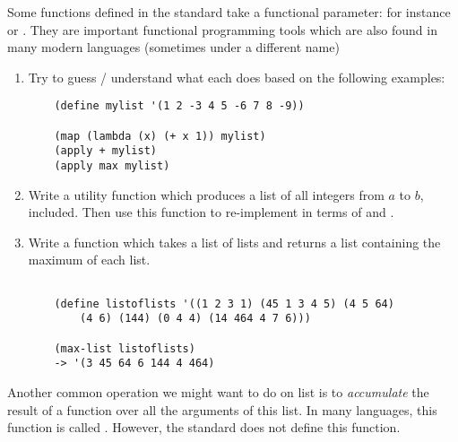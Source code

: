 \documentclass{../../../tp}
\begin{document}
\begin{instruction}
	Some functions defined in the \scheme standard take a functional parameter: for instance  or . They are important functional programming tools which are also found in many modern languages (sometimes under a different name)
	
	\begin{enumerate}
		\item 	Try to guess / understand what each does based on the following examples:
	
	\begin{verbatim}
	(define mylist '(1 2 -3 4 5 -6 7 8 -9))
	
	(map (lambda (x) (+ x 1)) mylist)
	(apply + mylist)
	(apply max mylist)
	\end{verbatim}

	\item Write a  utility function which produces a list of all integers from $a$ to $b$, included. Then use this function to re-implement   in terms of  and  .

	\item Write a function which takes a list of lists and returns a list containing the maximum of each list.
	\begin{verbatim}
	
	(define listoflists '((1 2 3 1) (45 1 3 4 5) (4 5 64) 
		(4 6) (144) (0 4 4) (14 464 4 7 6)))
	
	(max-list listoflists)
	-> '(3 45 64 6 144 4 464)
	\end{verbatim}
	\end{enumerate}
\end{instruction}

Another common operation we might want to do on list is to \emph{accumulate} the result of a function over all the arguments of this list. In many languages, this function is called . However, the \scheme standard does not define this function. 
\end{document}
